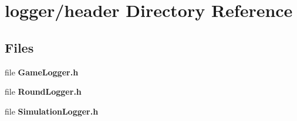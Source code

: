 \section{logger/header Directory Reference}
\label{dir_ff65d6ce85fc0d801d16f4ef07e17167}
\subsection*{Files}
\begin{DoxyCompactItemize}
\item 
file {\bfseries Game\-Logger.\-h}
\item 
file {\bfseries Round\-Logger.\-h}
\item 
file {\bfseries Simulation\-Logger.\-h}
\end{DoxyCompactItemize}
